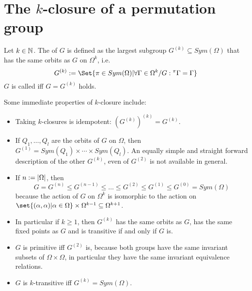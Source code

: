 \documentclass[fontsize=11pt,fleqn,a4paper]{scrartcl}
\begin{document}
\section{The $k$-closure of a permutation group}

\begin{definition}[$k$-closure]
Let $k\in\mathbb{N}$. The  of $G$ is defined as the largest subgroup $G^{(k)}\subseteq Sym(\Omega)$ that has the same orbits as $G$ on $\Omega^k$, i.e.
\[G^{(k)} := \Set{\pi\in Sym(\Omega) | \forall \Gamma\in \Omega^k/G: {^\pi\Gamma} = \Gamma}\]
$G$ is called  iff $G=G^{(k)}$ holds.
\end{definition}

\begin{remark}
Some immediate properties of $k$-closure include:
\begin{itemize}
\item Taking $k$-closures is idempotent: $(G^{(k)})^{(k)} = G^{(k)}$.

\item If $Q_1,\ldots,Q_l$ are the orbits of $G$ on $\Omega$, then $G^{(1)} = Sym(Q_1) \times \cdots\times Sym(Q_l)$. An equally simple and straight forward description of the other $G^{(k)}$, even of $G^{(2)}$ is not available in general.

\item If $n:=\lvert\Omega\rvert$, then
\[G = G^{(n)} \leq G^{(n-1)} \leq \ldots \leq G^{(2)}\leq G^{(1)} \leq G^{(0)} = Sym(\Omega)\]
because the action of $G$ on $\Omega^k$ is isomorphic to the action on $\set{(\alpha,\alpha) | \alpha\in\Omega} \times \Omega^{k-1} \subseteq\Omega^{k+1}$.

\item In particular if $k\geq 1$, then $G^{(k)}$ has the same orbits as $G$, has the same fixed points as $G$ and is transitive if and only if $G$ is.

\item $G$ is primitive iff $G^{(2)}$ is, because both groups have the same invariant subsets of $\Omega\times\Omega$, in particular they have the same invariant equivalence relations.

\item $G$ is $k$-transitive iff $G^{(k)} = Sym(\Omega)$.
\end{itemize}
\end{remark}
\end{document}
